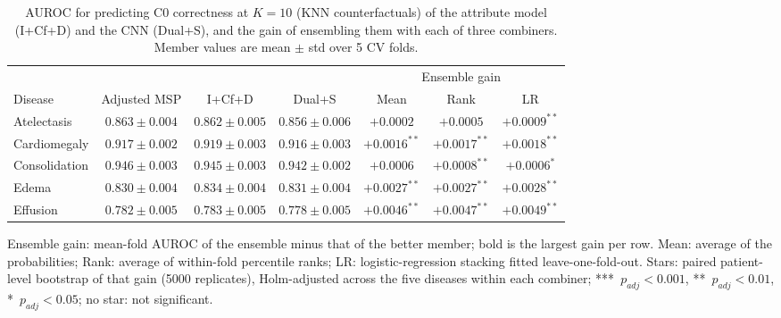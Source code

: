 \begin{table}[htbp]
\centering
\small
\caption{AUROC for predicting C0 correctness at $K=10$ (KNN counterfactuals) of the attribute model (I+Cf+D) and the CNN (Dual+S), and the gain of ensembling them with each of three combiners. Member values are mean $\pm$ std over 5 CV folds.}
\label{tab:ens_knn}
\begin{threeparttable}
\begin{tabular}{lc|cc|ccc}
\toprule
\multicolumn{4}{c}{} & \multicolumn{3}{c}{Ensemble gain} \\
\cmidrule(l){5-7}
Disease & Adjusted MSP & I+Cf+D & Dual+S & Mean & Rank & LR \\
\midrule
Atelectasis & $\mathbf{0.863} \pm 0.004$ & $0.862 \pm 0.005$ & $0.856 \pm 0.006$ & $+0.0002$ & $+0.0005$ & $\mathbf{+0.0009}^{**}$ \\
Cardiomegaly & $0.917 \pm 0.002$ & $\mathbf{0.919} \pm 0.003$ & $0.916 \pm 0.003$ & $+0.0016^{**}$ & $+0.0017^{**}$ & $\mathbf{+0.0018}^{**}$ \\
Consolidation & $\mathbf{0.946} \pm 0.003$ & $0.945 \pm 0.003$ & $0.942 \pm 0.002$ & $+0.0006$ & $\mathbf{+0.0008}^{**}$ & $+0.0006^{*}$ \\
Edema & $0.830 \pm 0.004$ & $\mathbf{0.834} \pm 0.004$ & $0.831 \pm 0.004$ & $+0.0027^{**}$ & $+0.0027^{**}$ & $\mathbf{+0.0028}^{**}$ \\
Effusion & $0.782 \pm 0.005$ & $\mathbf{0.783} \pm 0.005$ & $0.778 \pm 0.005$ & $+0.0046^{**}$ & $+0.0047^{**}$ & $\mathbf{+0.0049}^{**}$ \\
\bottomrule
\end{tabular}
\begin{tablenotes}\footnotesize
\item Ensemble gain: mean-fold AUROC of the ensemble minus that of the better member; bold is the largest gain per row. Mean: average of the probabilities; Rank: average of within-fold percentile ranks; LR: logistic-regression stacking fitted leave-one-fold-out. Stars: paired patient-level bootstrap of that gain (5000 replicates), Holm-adjusted across the five diseases within each combiner; ***~$p_{adj} < 0.001$, **~$p_{adj} < 0.01$, *~$p_{adj} < 0.05$; no star: not significant.
\end{tablenotes}
\end{threeparttable}
\end{table}
